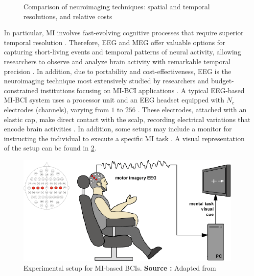 \begin{figure}[h!]
    \centering
    \resizebox{0.8\linewidth}{!}{}
    \caption{Comparison of neuroimaging techniques: spatial and temporal resolutions, and relative costs}\label{fig:neuroimagig}
\end{figure}

In particular, MI involves fast-evolving cognitive processes that require superior temporal resolution \cite{varbu2022past}. Therefore, EEG and MEG offer valuable options for capturing short-living events and temporal patterns of neural activity, allowing researchers to observe and analyze brain activity with remarkable temporal precision \cite{alsharif2020neuromarketing}. In addition, due to portability and cost-effectiveness, EEG is the neuroimaging technique most extensively studied by researchers and budget-constrained institutions focusing on MI-BCI applications \cite{janapati2023advances, hosseini2020review, shao2020eeg, khan2020review, lopez2020beyond, ramadan2017brain, fogelson2013functional}. A typical EEG-based MI-BCI system uses a processor unit and an EEG headset equipped with $N_c$ electrodes (channels), varying from $1$ to $256$ \cite{grigorev2021bci, rashid2020current}. These electrodes, attached with an elastic cap, make direct contact with the scalp, recording electrical variations that encode brain activities \cite{varbu2022past}. In addition, some setups may include a monitor for instructing the individual to execute a specific MI task \cite{gu2021eeg}. A visual representation of the setup can be found in \cref{fig:eegsetup}.

\begin{figure}[!ht]
		\centering
		\includegraphics{Figures/preliminaries/EEG-setup.png}
		\caption{Experimental setup for MI-based BCIs. \textbf{{Source}
				:} {Adapted from} \cite{grigorev2021bci}}
		\label{fig:eegsetup}
\end{figure}

